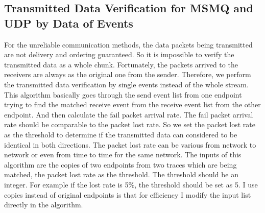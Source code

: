 \subsection{Transmitted Data Verification for MSMQ and UDP by Data of Events}
For the unreliable communication methods, the data packets being transmitted are not delivery and ordering guaranteed. So it is impossible to verify the transmitted data as a whole chunk. Fortunately, the packets arrived to the receivers are always as the original one from the sender. Therefore, we perform the transmitted data verification by single events instead of the whole stream. This algorithm basically goes through the send event list from one endpoint trying to find the matched receive event from the receive event list from the other endpoint. And then calculate the fail packet arrival rate. The fail packet arrival rate should be comparable to the packet lost rate. So we set the packet lost rate as the threshold to determine if the transmitted data can considered to be identical in both directions. The packet lost rate can be various from network to network or even from time to time for the same network. The inputs of this algorithm are the copies of two endpoints from two traces which are being matched, the packet lost rate as the threshold. The threshold should be an integer. For example if the lost rate is 5\%, the threshold should be set as 5. I use copies instead of original endpoints is that for efficiency I modify the input list directly in the algorithm.
